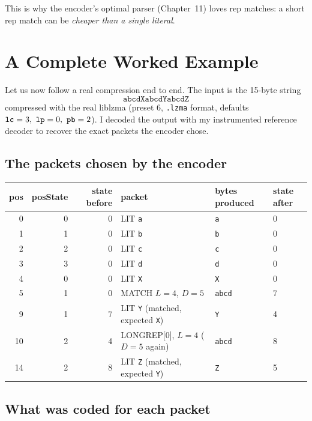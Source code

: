 \documentclass[11pt,a4paper,oneside]{book}
\newcommand{\code}[1]{\texttt{\detokenize{#1}}}
\begin{document}
This is why the encoder's optimal parser (Chapter~11) loves rep matches: a short rep match can be \emph{cheaper than a single literal}.

\chapter{A Complete Worked Example}

Let us now follow a real compression end to end. The input is the 15-byte string
\[
\texttt{abcdXabcdYabcdZ}
\]
compressed with the real liblzma (preset 6, \texttt{.lzma} format, defaults $\code{lc}=3,\ \code{lp}=0,\ \code{pb}=2$). I decoded the output with my instrumented
reference decoder to recover the exact packets the encoder chose.

\section{The packets chosen by the encoder}

\begin{center}
\small
\begin{tabular}{rrrlll}
\toprule
pos & posState & state before & packet & bytes produced & state after\\
\midrule
0 & 0 & 0 & LIT \texttt{a} & \texttt{a} & 0\\
1 & 1 & 0 & LIT \texttt{b} & \texttt{b} & 0\\
2 & 2 & 0 & LIT \texttt{c} & \texttt{c} & 0\\
3 & 3 & 0 & LIT \texttt{d} & \texttt{d} & 0\\
4 & 0 & 0 & LIT \texttt{X} & \texttt{X} & 0\\
5 & 1 & 0 & MATCH $L=4$, $D=5$ & \texttt{abcd} & 7\\
9 & 1 & 7 & LIT \texttt{Y} (matched, expected \texttt{X}) & \texttt{Y} & 4\\
10 & 2 & 4 & LONGREP[0], $L=4$ ($D=5$ again) & \texttt{abcd} & 8\\
14 & 2 & 8 & LIT \texttt{Z} (matched, expected \texttt{Y}) & \texttt{Z} & 5\\
\bottomrule
\end{tabular}
\end{center}

\section{What was coded for each packet}
\end{document}
